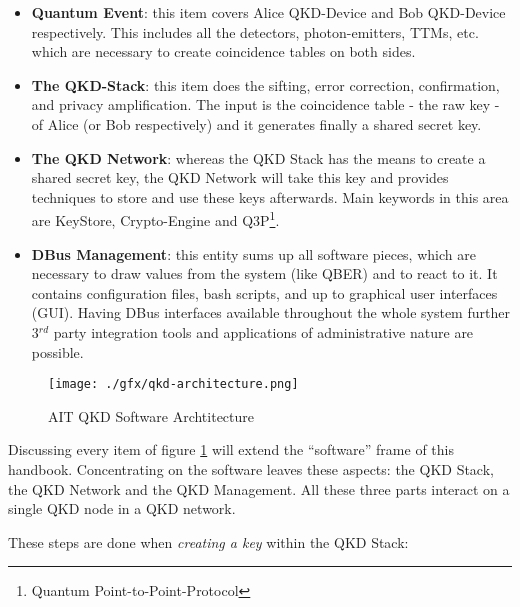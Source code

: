 \begin{itemize}

    \item \textbf{Quantum Event}: this item covers Alice QKD-Device  and Bob QKD-Device respectively. This includes all the detectors, photon-emitters, TTMs, etc. which are necessary to create coincidence tables on both sides.

    \item \textbf{The QKD-Stack}: this item does the sifting, error correction, confirmation, and privacy amplification. The input is the coincidence table - the raw key - of Alice (or Bob respectively) and it generates finally a shared secret key.

    \item \textbf{The QKD Network}: whereas the QKD Stack has the means to create a shared secret key, the QKD Network will take this key and provides techniques to store and use these keys afterwards. Main keywords in this area are KeyStore, Crypto-Engine and Q3P\footnote{Quantum Point-to-Point-Protocol}.

    \item \textbf{DBus Management}: this entity sums up all software pieces, which are necessary to draw values from the system (like QBER) and to react to it. It contains configuration files, bash scripts, and up to graphical user interfaces (GUI). Having DBus interfaces available throughout the whole system further 3$^{rd}$ party integration tools and applications of administrative nature are possible.

\end{itemize}

\medskip

\begin{figure}[h]
    \centering
    \texttt{[image: ./gfx/qkd-architecture.png]}
    \caption{AIT QKD Software Archtitecture}
    \label{fig:qkd-architecture}
\end{figure}

\medskip

Discussing every item of figure \ref{fig:qkd-architecture} will extend the ``software'' frame of this handbook. Concentrating on the software leaves these aspects: the QKD Stack, the QKD Network and the QKD Management. All these three parts interact on a single QKD node in a QKD network. 

\bigskip

These steps are done when \emph{creating a key} within the QKD Stack:

